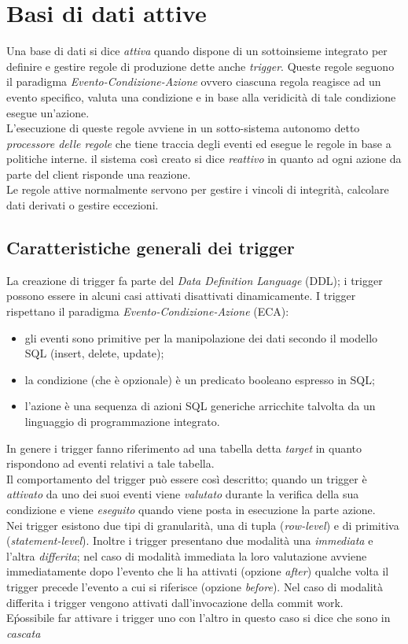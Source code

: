 \label{capitolo4}
\section{Basi di dati attive}
Una base di dati si dice \emph{attiva} quando dispone di un sottoinsieme integrato per definire e gestire regole di produzione dette anche \emph{trigger}. Queste regole seguono il paradigma \emph{Evento-Condizione-Azione} ovvero ciascuna regola reagisce ad un evento specifico, valuta una condizione e in base alla veridicità di tale condizione esegue un'azione.\\
L'esecuzione di queste regole avviene in un sotto-sistema autonomo detto \emph{processore delle regole} che tiene traccia degli eventi ed esegue le regole in base a politiche interne. il sistema così creato si dice \emph{reattivo} in quanto ad ogni azione da parte del client risponde una reazione.\\
Le regole attive normalmente servono per gestire i vincoli di integrità, calcolare dati derivati o gestire eccezioni.
\subsection{Caratteristiche generali dei trigger}
La creazione di trigger fa parte del \emph{Data Definition Language} (DDL); i trigger possono essere in alcuni casi attivati disattivati dinamicamente.
I trigger rispettano il paradigma \emph{Evento-Condizione-Azione} (ECA):
\begin{itemize}
\item gli eventi sono primitive per la manipolazione dei dati secondo il modello SQL (\textsf{insert, delete, update});
\item la condizione (che è opzionale) è un predicato booleano espresso in SQL;
\item l'azione è una sequenza di azioni SQL generiche arricchite talvolta da un linguaggio di programmazione integrato.
\end{itemize}
In genere i trigger fanno riferimento ad una tabella detta \emph{target} in quanto rispondono ad eventi relativi a tale tabella.\\
Il comportamento del trigger può essere così descritto; quando un trigger è \emph{attivato} da uno dei suoi eventi viene \emph{valutato} durante la verifica della sua condizione e viene \emph{eseguito} quando viene posta in esecuzione la parte azione.\\
Nei trigger esistono due tipi di granularità, una di tupla (\emph{row-level}) e di primitiva (\emph{statement-level}). Inoltre i trigger presentano due modalità una \emph{immediata} e l'altra \emph{differita}; nel caso di modalità immediata la loro valutazione avviene immediatamente dopo l'evento che li ha attivati (opzione \emph{after}) qualche volta il trigger precede l'evento a cui si riferisce (opzione \emph{before}). Nel caso di modalità differita i trigger vengono attivati dall'invocazione della \textsf{commit work}.\\
E\' possibile far attivare i trigger uno con l'altro in questo caso si dice che sono in \emph{cascata}

